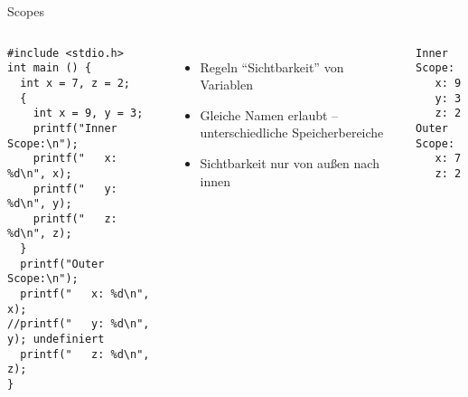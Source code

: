 \begin{frame}[fragile]{Scopes}
%
\begin{columns}[b]
\begin{codebox}
\begin{verbatim}
#include <stdio.h>
int main () {
  int x = 7, z = 2;
  {
    int x = 9, y = 3;
    printf("Inner Scope:\n");
    printf("   x: %d\n", x);
    printf("   y: %d\n", y);
    printf("   z: %d\n", z);
  }
  printf("Outer Scope:\n");
  printf("   x: %d\n", x);
//printf("   y: %d\n", y); undefiniert 
  printf("   z: %d\n", z);
}
\end{verbatim}
\end{codebox}
%
\begin{itemize}
\item Regeln \enquote{Sichtbarkeit} von Variablen
\item Gleiche Namen erlaubt -- unterschiedliche Speicherbereiche
\item Sichtbarkeit nur von außen nach innen
\end{itemize}
%
\begin{cmdbox}[Ausgabe]
\begin{verbatim}
Inner Scope:
   x: 9
   y: 3
   z: 2
Outer Scope:
   x: 7
   z: 2
\end{verbatim}
\end{cmdbox}
\end{columns}
%
\end{frame}


